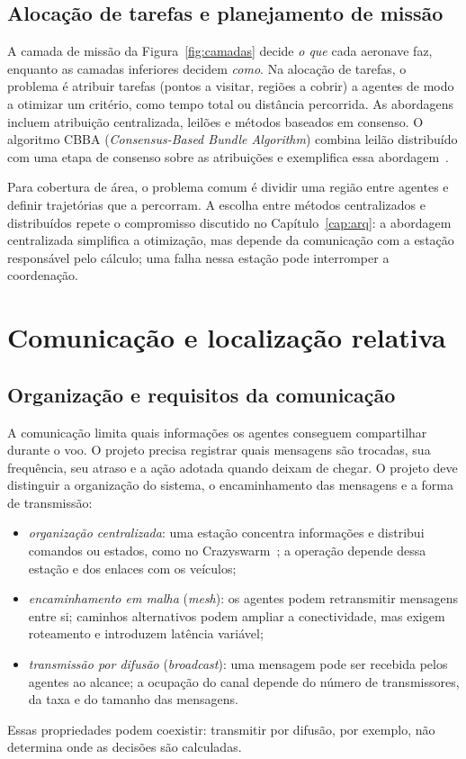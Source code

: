 \documentclass[11pt,a4paper,oneside]{book}
\numberwithin{equation}{chapter}
\begin{document}
\section{Alocação de tarefas e planejamento de missão}
A camada de missão da Figura~\ref{fig:camadas} decide \emph{o que} cada aeronave faz, enquanto as camadas inferiores decidem \emph{como}. Na alocação de tarefas, o problema é atribuir tarefas (pontos a visitar, regiões a cobrir) a agentes de modo a otimizar um critério, como tempo total ou distância percorrida. As abordagens incluem atribuição centralizada, leilões e métodos baseados em consenso. O algoritmo CBBA (\emph{Consensus-Based Bundle Algorithm}) combina leilão distribuído com uma etapa de consenso sobre as atribuições e exemplifica essa abordagem~\cite{cbba}.

Para cobertura de área, o problema comum é dividir uma região entre agentes e definir trajetórias que a percorram. A escolha entre métodos centralizados e distribuídos repete o compromisso discutido no Capítulo~\ref{cap:arq}: a abordagem centralizada simplifica a otimização, mas depende da comunicação com a estação responsável pelo cálculo; uma falha nessa estação pode interromper a coordenação.

\chapter{Comunicação e localização relativa}\label{cap:com}
\section{Organização e requisitos da comunicação}
A comunicação limita quais informações os agentes conseguem compartilhar durante o voo. O projeto precisa registrar quais mensagens são trocadas, sua frequência, seu atraso e a ação adotada quando deixam de chegar. O projeto deve distinguir a organização do sistema, o encaminhamento das mensagens e a forma de transmissão:
\begin{itemize}
\item \emph{organização centralizada}: uma estação concentra informações e distribui comandos ou estados, como no Crazyswarm~\cite{crazyswarm}; a operação depende dessa estação e dos enlaces com os veículos;
\item \emph{encaminhamento em malha} (\emph{mesh}): os agentes podem retransmitir mensagens entre si; caminhos alternativos podem ampliar a conectividade, mas exigem roteamento e introduzem latência variável;
\item \emph{transmissão por difusão} (\emph{broadcast}): uma mensagem pode ser recebida pelos agentes ao alcance; a ocupação do canal depende do número de transmissores, da taxa e do tamanho das mensagens.
\end{itemize}
Essas propriedades podem coexistir: transmitir por difusão, por exemplo, não determina onde as decisões são calculadas.
\end{document}
